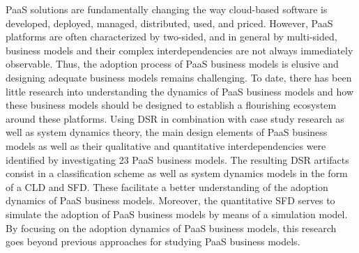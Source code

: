 
\ac{PaaS} solutions are fundamentally changing the way cloud-based software is developed, deployed, managed, distributed, used, and priced. However, \ac{PaaS} platforms are often characterized by two-sided, and in general by multi-sided, business models and their complex interdependencies are not always immediately observable. Thus, the adoption process of \ac{PaaS} business models is elusive and designing adequate business models remains challenging. To date, there has been little research into understanding the dynamics of \ac{PaaS} business models and how these business models should be designed to establish a flourishing ecosystem around these platforms. Using \ac{DSR} in combination with case study research as well as system dynamics theory, the main design elements of \ac{PaaS} business models as well as their qualitative and quantitative interdependencies were identified by investigating 23 PaaS business models. The resulting \ac{DSR} artifacts consist in a classification scheme as well as system dynamics models in the form of a \ac{CLD} and \ac{SFD}. These facilitate a better understanding of the adoption dynamics of \ac{PaaS} business models. Moreover, the quantitative \ac{SFD} serves to simulate the adoption of \ac{PaaS} business models by means of a simulation model. By focusing on the adoption dynamics of \ac{PaaS} business models, this research goes beyond previous approaches for studying \ac{PaaS} business models.


\vspace*{5mm}

